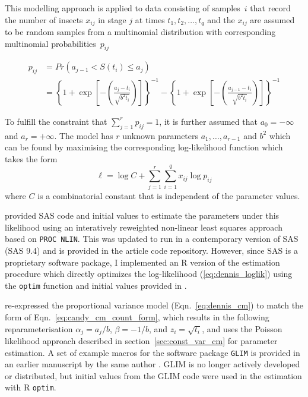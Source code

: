 This modelling approach is applied to data consisting of samples~$i$ that record the number of insects $x_{ij}$ in stage $j$ at times $t_1, t_2, \dots, t_q$ and the $x_{ij}$ are assumed to be random samples from a multinomial distribution with corresponding multinomial probabilities~$p_{ij}$

\begin{align}
p_{ij} & = Pr(a_{j-1} < S(t_i) \leq a_{j})\\
& =  \left\{ 1 + \exp\left[-\left(\frac{a_j-t_i}{\sqrt{b^2t_i}}\right)\right]\right\}^{-1} - \left\{ 1 + \exp\left[-\left(\frac{a_{j-1}-t_i}{\sqrt{b^2t_i}}\right)\right]\right\}^{-1}\label{eq:dennis_cm}
\end{align}

To fulfill the constraint that $\sum_{j=1}^r p_{ij}= 1$, it is further assumed that $a_0 = -\infty$ and $a_r = +\infty$.
The model has $r$ unknown parameters $a_1, \dots, a_{r-1}$ and $b^2$ which can be found by maximising the corresponding log-likelihood function which takes the form 
\begin{equation}
\mathcal{\ell} = \log C + \sum_{j=1}^r \sum_{i=1}^q x_{ij} \log p_{ij}
\label{eq:dennis_loglik}
\end{equation}
where $C$ is a combinatorial constant that is independent of the parameter values.

\citet{dennis1986stochastic} provided SAS code and initial values to estimate the parameters under this likelihood using an interatively reweighted non-linear least squares approach based on \verb+PROC NLIN+. 
This was updated to run in a contemporary version of SAS (SAS 9.4) and is provided in the article code repository. 
However, since SAS is a proprietary software package, I implemented an R version of the estimation procedure which directly optimizes the log-likelihood (\ref{eq:dennis_loglik}) using the \verb+optim+ function and initial values provided in \citep{dennis1986stochastic}.

\citet{candy1991modeling} re-expressed the proportional variance model (Eqn.~\ref{eq:dennis_cm}) to match the form of Eqn.~\ref{eq:candy_cm_count_form}, which results in the following re\-para\-meter\-isation $\alpha_j = a_j/b$, $\beta = -1/b$, and $z_i = \sqrt{t_i}$, and uses the Poisson likelihood approach described in section~\ref{sec:const_var_cm} for parameter estimation. 
A set of example macros for the software package \verb+GLIM+ \citep{aitkin1989statistical} is provided in an earlier manuscript by the same author \citep{candy1990biology}. GLIM is no longer actively developed or distributed, but initial values from the GLIM code were used in the estimation with R \verb+optim+.

